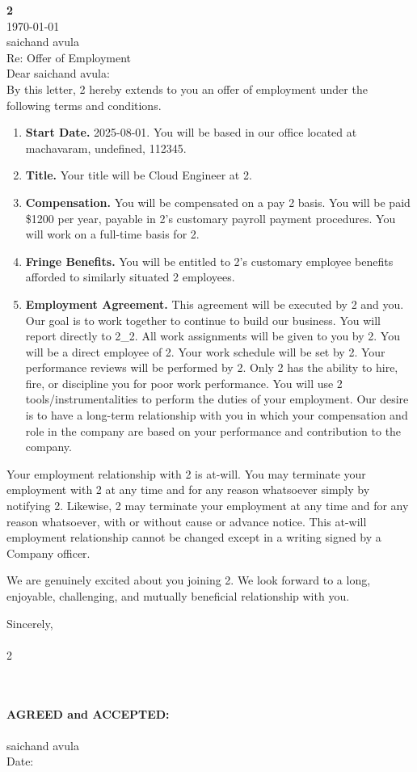 \documentclass[12pt]{article}
\begin{document}
\textbf{2} \\
\today \\
saichand avula \\
Re: Offer of Employment \\
Dear saichand avula: \\

By this letter, 2 hereby extends to you an offer of employment under the following terms and conditions.

\begin{enumerate}
    \item \textbf{Start Date.} 2025-08-01. You will be based in our office located at machavaram, undefined, 112345.
    \item \textbf{Title.} Your title will be Cloud Engineer at 2.
    \item \textbf{Compensation.} You will be compensated on a pay 2 basis. You will be paid \$1200 per year, payable in 2's customary payroll payment procedures. You will work on a full-time basis for 2.
    \item \textbf{Fringe Benefits.} You will be entitled to 2's customary employee benefits afforded to similarly situated 2 employees.
    \item \textbf{Employment Agreement.} This agreement will be executed by 2 and you. Our goal is to work together to continue to build our business. You will report directly to 2_2. All work assignments will be given to you by 2. You will be a direct employee of 2. Your work schedule will be set by 2. Your performance reviews will be performed by 2. Only 2 has the ability to hire, fire, or discipline you for poor work performance. You will use 2 tools/instrumentalities to perform the duties of your employment. Our desire is to have a long-term relationship with you in which your compensation and role in the company are based on your performance and contribution to the company.
\end{enumerate}

Your employment relationship with 2 is at-will. You may terminate your employment with 2 at any time and for any reason whatsoever simply by notifying 2. Likewise, 2 may terminate your employment at any time and for any reason whatsoever, with or without cause or advance notice. This at-will employment relationship cannot be changed except in a writing signed by a Company officer.

We are genuinely excited about you joining 2. We look forward to a long, enjoyable, challenging, and mutually beneficial relationship with you.

\vspace{0.5in}

Sincerely, \\
[HR Signature] \\
2 \\
[HR Name] \\
[HR Title] \\

\vspace{0.5in}

\textbf{AGREED and ACCEPTED:} \\
\vspace{0.5in} \\
saichand avula \\
Date: \underline{\hspace{2in}}
\end{document}

